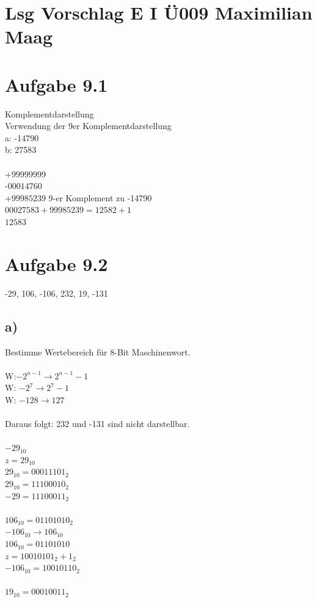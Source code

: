 \documentclass{article}
\begin{document}
	\section*{Lsg Vorschlag E I Ü009 Maximilian Maag}
	\section*{Aufgabe 9.1}
	Komplementdarstellung \\
	Verwendung der 9er Komplementdarstellung \\
	a: -14790 \\
	b: 27583 \\
	\\
	+$99999999$ \\
	-$00014760$ \\
	+$99985239$ 9-er Komplement zu -14790 \\
	$00027583 + 99985239 = 12582 + 1$ \\
	$12583$

	\section*{Aufgabe 9.2}
	-29, 106, -106, 232, 19, -131
	\subsection*{a)}
	Bestimme Wertebereich für 8-Bit Maschinenwort. \\
	\\
	W:$-2^{n-1} \to 2^{n-1} - 1$ \\
	W: $-2^7 \to 2^7 - 1$ \\
	W: $-128 \to 127$ \\
	\\
	Daraus folgt: 232 und -131 sind nicht darstellbar. \\
	\\
	$-29_{10}$ \\
	$z = 29_{10}$ \\
	$29_{10} = 00011101_2$ \\
	$29_{10} = 11100010_2$ \\
	$-29 = 11100011_2$ \\
	\\
	$106_{10} =  01101010_2$ \\
	$-106_{10} \to 106_{10}$ \\
	$106_{10} = 01101010$ \\
	$z = 10010101_2 + 1_2$ \\
	$-106_{10} = 10010110_2$ \\
	\\
	$19_{10} = 00010011_2$ \\
	
\end{document}
